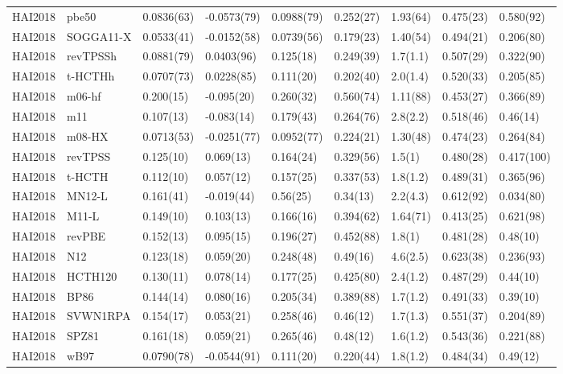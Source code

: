 \begin{table}[ht]
\begin{tabular}{lllllllll}
  HAI2018 & pbe50 & 0.0836(63) & -0.0573(79) & 0.0988(79) & 0.252(27) & 1.93(64) & 0.475(23) & 0.580(92) \\ 
  HAI2018 & SOGGA11-X & 0.0533(41) & -0.0152(58) & 0.0739(56) & 0.179(23) & 1.40(54) & 0.494(21) & 0.206(80) \\ 
  HAI2018 & revTPSSh & 0.0881(79) & 0.0403(96) & 0.125(18) & 0.249(39) & 1.7(1.1) & 0.507(29) & 0.322(90) \\ 
  HAI2018 & t-HCTHh & 0.0707(73) & 0.0228(85) & 0.111(20) & 0.202(40) & 2.0(1.4) & 0.520(33) & 0.205(85) \\ 
  HAI2018 & m06-hf & 0.200(15) & -0.095(20) & 0.260(32) & 0.560(74) & 1.11(88) & 0.453(27) & 0.366(89) \\ 
  HAI2018 & m11 & 0.107(13) & -0.083(14) & 0.179(43) & 0.264(76) & 2.8(2.2) & 0.518(46) & 0.46(14) \\ 
  HAI2018 & m08-HX & 0.0713(53) & -0.0251(77) & 0.0952(77) & 0.224(21) & 1.30(48) & 0.474(23) & 0.264(84) \\ 
  HAI2018 & revTPSS & 0.125(10) & 0.069(13) & 0.164(24) & 0.329(56) & 1.5(1) & 0.480(28) & 0.417(100) \\ 
  HAI2018 & t-HCTH & 0.112(10) & 0.057(12) & 0.157(25) & 0.337(53) & 1.8(1.2) & 0.489(31) & 0.365(96) \\ 
  HAI2018 & MN12-L & 0.161(41) & -0.019(44) & 0.56(25) & 0.34(13) & 2.2(4.3) & 0.612(92) & 0.034(80) \\ 
  HAI2018 & M11-L & 0.149(10) & 0.103(13) & 0.166(16) & 0.394(62) & 1.64(71) & 0.413(25) & 0.621(98) \\ 
  HAI2018 & revPBE & 0.152(13) & 0.095(15) & 0.196(27) & 0.452(88) & 1.8(1) & 0.481(28) & 0.48(10) \\ 
  HAI2018 & N12 & 0.123(18) & 0.059(20) & 0.248(48) & 0.49(16) & 4.6(2.5) & 0.623(38) & 0.236(93) \\ 
  HAI2018 & HCTH120 & 0.130(11) & 0.078(14) & 0.177(25) & 0.425(80) & 2.4(1.2) & 0.487(29) & 0.44(10) \\ 
  HAI2018 & BP86 & 0.144(14) & 0.080(16) & 0.205(34) & 0.389(88) & 1.7(1.2) & 0.491(33) & 0.39(10) \\ 
  HAI2018 & SVWN1RPA & 0.154(17) & 0.053(21) & 0.258(46) & 0.46(12) & 1.7(1.3) & 0.551(37) & 0.204(89) \\ 
  HAI2018 & SPZ81 & 0.161(18) & 0.059(21) & 0.265(46) & 0.48(12) & 1.6(1.2) & 0.543(36) & 0.221(88) \\ 
  HAI2018 & wB97 & 0.0790(78) & -0.0544(91) & 0.111(20) & 0.220(44) & 1.8(1.2) & 0.484(34) & 0.49(12) \\ 

\end{tabular}
\end{table}
